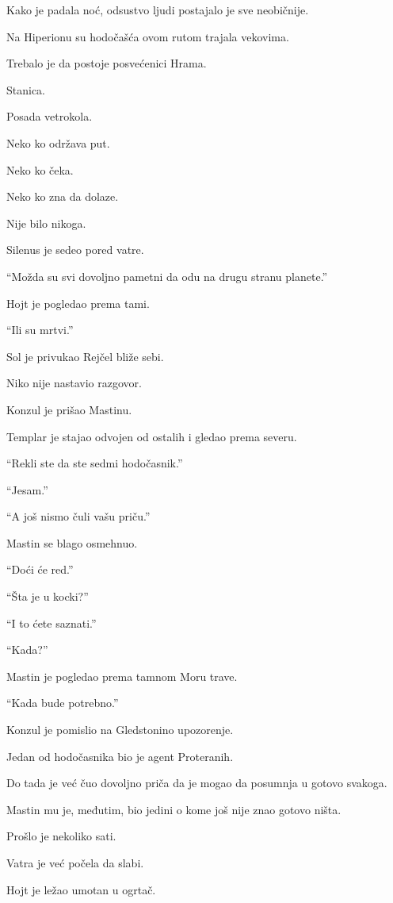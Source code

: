 Kako je padala noć, odsustvo ljudi postajalo je sve neobičnije.

Na Hiperionu su hodočašća ovom rutom trajala vekovima.

Trebalo je da postoje posvećenici Hrama.

Stanica.

Posada vetrokola.

Neko ko održava put.

Neko ko čeka.

Neko ko zna da dolaze.

Nije bilo nikoga.

Silenus je sedeo pored vatre.

``Možda su svi dovoljno pametni da odu na drugu stranu planete.''

Hojt je pogledao prema tami.

``Ili su mrtvi.''

Sol je privukao Rejčel bliže sebi.

Niko nije nastavio razgovor.

\bigskip

Konzul je prišao Mastinu.

Templar je stajao odvojen od ostalih i gledao prema severu.

``Rekli ste da ste sedmi hodočasnik.''

``Jesam.''

``A još nismo čuli vašu priču.''

Mastin se blago osmehnuo.

``Doći će red.''

``Šta je u kocki?''

``I to ćete saznati.''

``Kada?''

Mastin je pogledao prema tamnom Moru trave.

``Kada bude potrebno.''

Konzul je pomislio na Gledstonino upozorenje.

Jedan od hodočasnika bio je agent Proteranih.

Do tada je već čuo dovoljno priča da je mogao da posumnja u gotovo svakoga.

Mastin mu je, međutim, bio jedini o kome još nije znao gotovo ništa.

\bigskip

Prošlo je nekoliko sati.

Vatra je već počela da slabi.

Hojt je ležao umotan u ogrtač.

